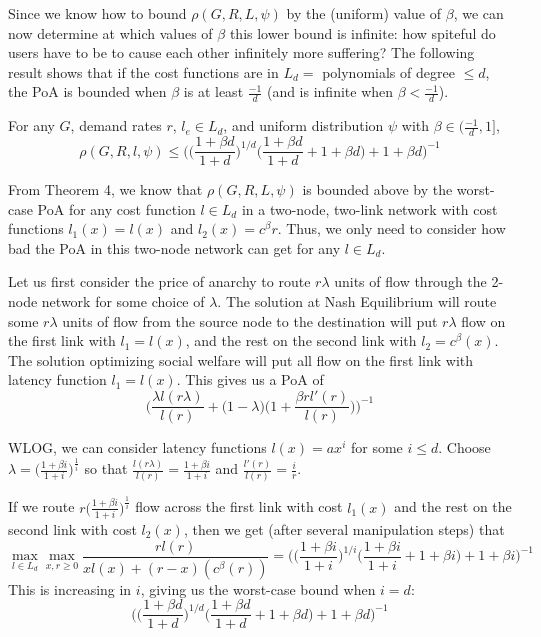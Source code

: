 Since we know how to bound $\rho(G,R,{L},\psi)$ by the (uniform) value of $\beta$, we can now determine at which values of $\beta$ this lower bound is infinite: how spiteful do users have to be to cause each other infinitely more suffering? The following result shows that if the cost functions are in $L_d =$ polynomials of degree $\le d$, the PoA is bounded when $\beta$ is at least $\frac{-1}{d}$ (and is infinite when $\beta < \frac{-1}d$).
\begin{theorem}
For any $G$, demand rates $r$, $l_e \in L_d$,
and uniform distribution $\psi$ with $\beta \in (\frac{-1}{d}, 1]$,
    $$\rho(G,R,l,\psi) \le \Big(\Big(\frac{1+\beta d}{1+d}\Big)^{1/d}\Big(\frac{1+\beta d}{1+d} + 1 + \beta d\Big)+ 1 + \beta d\Big)^{-1}$$
\end{theorem}
\begin{proof-sketch}
From Theorem 4, we know that 
$\rho(G,R,{L},\psi)$%
 is bounded above by the worst-case PoA for any cost function $l \in L_d$ in a two-node, two-link network with cost functions $l_1(x) = l(x)$ and $l_2(x) = c^\beta{r}$.
Thus, we only need to consider how bad the PoA in this two-node network can get for any $l\in L_d$.

Let us first consider the price of anarchy to route $r\lambda$ units of flow through the 2-node network for some choice of $\lambda$.
The solution at Nash Equilibrium will route some $r\lambda$ units of flow from the source node to the destination 
will put $r\lambda$ flow on the first link with $l_1 = l(x)$, and the rest on the second link with $l_2 = c^\beta(x)$.
The solution optimizing social welfare will put all flow on the first link with latency function $l_1 = l(x)$.
This gives us a PoA of
    $$\Big(\frac{\lambda l(r\lambda)}{l(r)} + \Big(1-\lambda\Big)\Big(1+\frac{\beta rl'(r)}{l(r)}\Big)\Big)^{-1}$$
    
    WLOG, we can consider latency functions $l(x) = ax^i$ for some $i \le d$. Choose $\lambda = \Big(\frac{1+\beta i}{1+i}\Big)^{\frac{1}{i}}$ so that $\frac{l(r\lambda)}{l(r)} = \frac{1+\beta i}{1+i}$ and $\frac{l'(r)}{l(r)} = \frac{i}{r}$.

If we route $r\Big(\frac{1+\beta i}{1+i}\Big)^{\frac{1}{i}}$ flow across the first link with cost $l_1(x)$ and the rest on the second link with cost $l_2(x)$, 
then we get (after several manipulation steps) that 
$$\max_{l\in{L_d}} \max_{x,r\ge 0} \frac{rl(r)}{xl(x) + (r-x)(c^\beta(r))} = \Big(\Big(\frac{1+\beta i}{1+i}\Big)^{1/i}\Big(\frac{1+\beta i}{1+i} + 1 + \beta i\Big)+ 1 + \beta i\Big)^{-1}$$
    This is increasing in $i$, giving us the worst-case bound when $i=d$:
$$\Big(\Big(\frac{1+\beta d}{1+d}\Big)^{1/d}\Big(\frac{1+\beta d}{1+d} + 1 + \beta d\Big)+ 1 + \beta d\Big)^{-1}$$
\end{proof-sketch}


